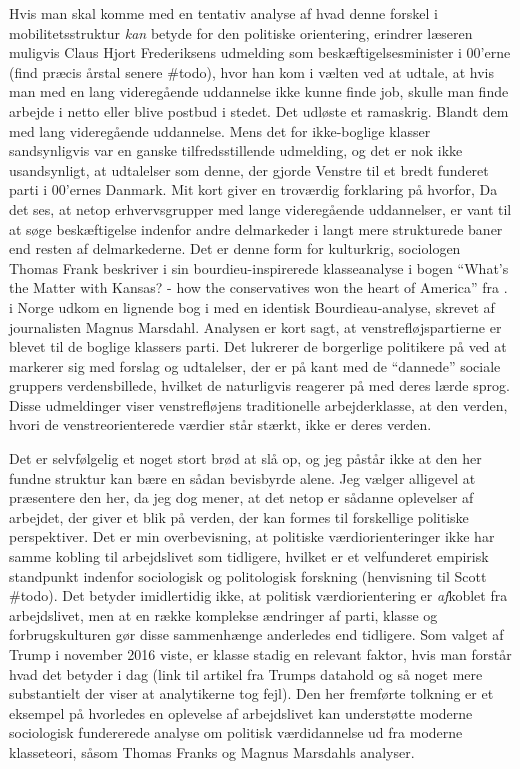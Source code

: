 Hvis man skal komme med en tentativ analyse af hvad denne forskel i mobilitetsstruktur \emph{kan} betyde for den politiske orientering, erindrer læseren muligvis Claus Hjort Frederiksens udmelding som beskæftigelsesminister i 00'erne (find præcis årstal senere \#todo), hvor han kom i vælten ved at udtale, at hvis man med en lang videregående uddannelse ikke kunne finde job, skulle man finde arbejde i netto eller blive postbud i stedet. Det udløste et ramaskrig. Blandt dem med lang videregående uddannelse. Mens det for ikke-boglige klasser sandsynligvis var en ganske tilfredsstillende udmelding, og det er nok ikke usandsynligt, at udtalelser som denne, der gjorde Venstre til et bredt funderet parti i 00'ernes Danmark. Mit kort giver en troværdig forklaring på hvorfor, Da det ses, at netop erhvervsgrupper med lange videregående uddannelser, er vant til at søge beskæftigelse indenfor andre delmarkeder i langt mere strukturede baner end resten af delmarkederne. Det er denne form for kulturkrig, sociologen Thomas Frank beskriver i sin bourdieu-inspirerede klasseanalyse i bogen “What's the Matter with Kansas? - how the conservatives won the heart of America” fra \citeyear{Frank2007}. i Norge udkom en lignende bog i \citeyear{Marsdal2007} med en identisk Bourdieau-analyse, skrevet af journalisten Magnus  Marsdahl. Analysen er kort sagt, at venstrefløjspartierne er blevet til de boglige klassers parti. Det lukrerer de borgerlige politikere på ved at markerer sig med forslag og udtalelser, der er på kant med de “dannede” sociale gruppers verdensbillede, hvilket de naturligvis reagerer på med deres lærde sprog. Disse udmeldinger viser venstrefløjens traditionelle arbejderklasse, at den verden, hvori de venstreorienterede værdier står stærkt, ikke er deres verden. 

Det er selvfølgelig et noget stort brød at slå op, og jeg påstår ikke at den her fundne struktur kan bære en sådan bevisbyrde alene. Jeg vælger alligevel at præsentere den her, da jeg dog mener, at det netop er sådanne oplevelser af arbejdet, der giver et blik på verden, der kan formes til forskellige politiske perspektiver. Det er min overbevisning, at politiske værdiorienteringer ikke har samme kobling til arbejdslivet som tidligere, hvilket er et velfunderet empirisk standpunkt indenfor sociologisk og politologisk forskning (henvisning til Scott \#todo). Det betyder imidlertidig ikke, at politisk værdiorientering er \emph{af}koblet fra arbejdslivet, men at en række komplekse ændringer af parti, klasse og forbrugskulturen gør disse sammenhænge anderledes end tidligere. Som valget af Trump i november 2016 viste, er klasse stadig en relevant faktor, hvis man forstår hvad det betyder i dag (link til artikel fra Trumps datahold og så noget mere substantielt der viser at analytikerne tog fejl). Den her fremførte tolkning er et eksempel på hvorledes en oplevelse af arbejdslivet kan understøtte moderne sociologisk fundererede analyse om politisk værdidannelse ud fra moderne klasseteori, såsom Thomas Franks og Magnus Marsdahls analyser.












